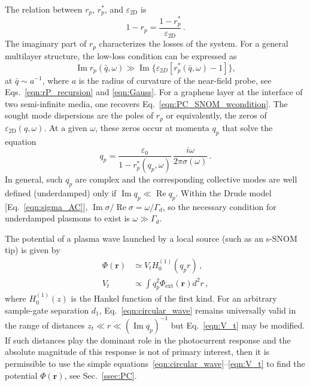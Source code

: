 \documentclass[aps, prb, reprint, superscriptaddress]{revtex4-2}
\DeclareMathOperator{\re}{Re}
\DeclareMathOperator{\im}{Im}
\renewcommand{\vec}{\mathbf}
\begin{document}
The relation between $r_p$, $r_p^*$, and $\varepsilon_\mathrm{2D}$ is
\begin{equation}
	1 - r_p = \frac{1 - r_p^*}{\varepsilon_\mathrm{2D}}\,.
	\label{eqn:r_p^*}
\end{equation}
The imaginary part of $r_p$ characterizes the losses of the system. 
For a general multilayer structure, the low-loss condition can be expressed as
\begin{equation}
	\im r_p(\bar{q}, \omega) \gg \im \{\varepsilon_{2D} \left[r_p^*(\bar{q}, \omega)-1\right]\},
\end{equation}
at $\bar{q}\sim a^{-1}$, where $a$ is the radius of curvature of the near-field probe, see Eqs.~\eqref{eqn:rP_recursion} and \eqref{eqn:Gauss}.
For a graphene layer at the interface of two semi-infinite media, one recovers Eq.~\eqref{eqn:PC_SNOM_wcondition}. 
The sought mode dispersions are the poles of $r_p$ or equivalently, the zeros of $\varepsilon_\mathrm{2D}(q, \omega)$.
At a given $\omega$, these zeros occur at momenta $q_p$ that solve the equation
\begin{equation}
	q_p = \frac{\varepsilon_0}{1 - r_p^*(q_p, \omega)}\,
	 \frac{i\omega}{2\pi \sigma(\omega)}\,.
\label{eqn:q_plasmon0}
\end{equation}
In general, such $q_p$ are complex and the corresponding collective modes are well defined (underdamped) only if $\im q_p \ll \re q_p$.
Within the Drude model [Eq.~\eqref{eqn:sigma_AC}], 
$\im \sigma / \re \sigma = {\omega} / {\Gamma_d}$,
so the necessary condition for underdamped plasmons to exist is $\omega \gg \Gamma_d$.

The potential of a plasma wave launched by a local source (such as an s-SNOM tip) is given by
\begin{align}
	\Phi(\vec{r}) &\simeq V_t H_0^{(1)}(q_p r)\,,
	\label{eqn:circular_wave}\\
	V_t &\propto \int q_p^2 \Phi_{\mathrm{ext}}(\vec{r}) d^2 r\,,
	\label{eqn:V_t}
\end{align}
where $H_0^{(1)}(z)$ is the Hankel function of the first kind.
For an arbitrary sample-gate separation $d_1$, Eq.~\eqref{eqn:circular_wave} remains universally valid
in the range of distances $z_t \ll r \ll (\im q_p)^{-1}$ but Eq.~\eqref{eqn:V_t} may be modified.
If such distances play the dominant role in the photocurrent response
and the absolute magnitude of this response is not of primary interest,
then it is permissible to use the simple equations~\eqref{eqn:circular_wave}--\eqref{eqn:V_t} to find the potential $\Phi(\vec{r})$, see Sec.~\ref{ssec:PC}.
\end{document}
